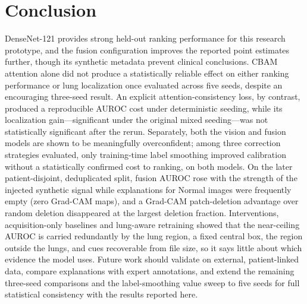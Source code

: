 \documentclass[11pt,a4paper]{article}
\begin{document}
\section{Conclusion}
DenseNet-121 provides strong held-out ranking performance for this research
prototype, and the fusion configuration improves the reported point
estimates further, though its synthetic metadata prevent clinical
conclusions. CBAM attention alone did not produce a statistically reliable
effect on either ranking performance or lung localization once evaluated
across five seeds, despite an encouraging three-seed result. An explicit
attention-consistency loss, by contrast, produced a reproducible AUROC cost
under deterministic seeding, while its localization gain---significant under
the original mixed seeding---was not statistically significant after the
rerun. Separately, both
the vision and fusion models are shown to be meaningfully overconfident;
among three correction strategies evaluated, only training-time label
smoothing improved calibration without a statistically confirmed cost to
ranking, on both models. On the later patient-disjoint, deduplicated split, fusion AUROC rose with the
strength of the injected synthetic signal while explanations for Normal images
were frequently empty (zero Grad-CAM maps), and a Grad-CAM patch-deletion advantage over random
deletion disappeared at the largest deletion fraction. Interventions, acquisition-only baselines and
lung-aware retraining showed that the near-ceiling AUROC is carried redundantly by the lung region, a fixed
central box, the region outside the lungs, and cues recoverable from file size, so it says little about which
evidence the model uses. Future work should validate on external,
patient-linked data, compare explanations with expert annotations, and
extend the remaining three-seed comparisons and the label-smoothing value
sweep to five seeds for full statistical consistency with the results
reported here.



\end{document}
